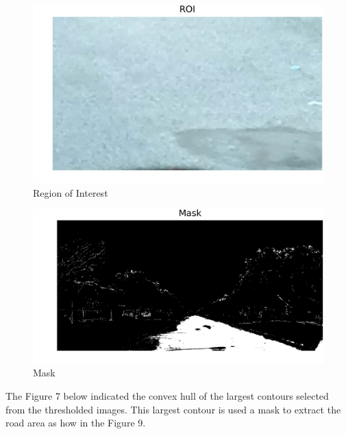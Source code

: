 \documentclass[journal]{IEEEtran}
\begin{document}
\begin{figure}[!htb]
\begin{center}
\includegraphics[scale=0.65]{Images/3_ROI.png}
\end{center}
\caption{Region of Interest}
\end{figure}

\begin{figure}[!htb]
\begin{center}
\includegraphics[scale=0.65]{Images/4_Mask.png}
\end{center}
\caption{Mask}
\end{figure}

\vspace{0.5cm}
\noindent The Figure 7 below indicated the convex hull of the largest contours selected from the thresholded images. This largest contour is used a mask to extract the road area as how in the Figure 9.
\end{document}
